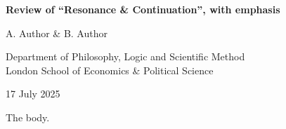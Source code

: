 {\noindent\LARGE\bfseries Review of “Resonance \& Continuation”, with \textbf{emphasis}\par}

{\noindent\large A. Author \& B. Author\par}

{\noindent Department of Philosophy, Logic and Scientific Method \\   London School of Economics \& Political Science\par}

{\noindent\large 17 July 2025\par}\medskip

The body.


